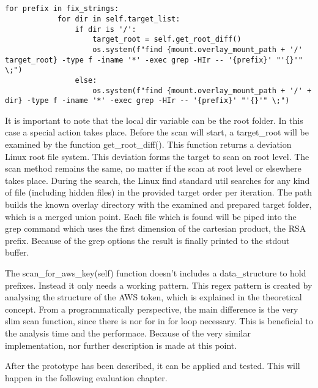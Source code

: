 \lstset{language=Python}          %
\begin{lstlisting}[]  % Start your code-block
	

for prefix in fix_strings:
            for dir in self.target_list:
                if dir is '/':
                    target_root = self.get_root_diff()
                    os.system(f"find {mount.overlay_mount_path + '/' target_root} -type f -iname '*' -exec grep -HIr -- '{prefix}' "'{}'" \;")
                else:
                    os.system(f"find {mount.overlay_mount_path + '/' + dir} -type f -iname '*' -exec grep -HIr -- '{prefix}' "'{}'" \;")
\end{lstlisting}
It is important to note that the local dir variable can be the root folder. In this case a special action takes place. Before the scan will start, a target\_root will be examined by the function get\_root\_diff().
This function returns a deviation Linux root file system. This deviation forms the target to scan on root level. The scan method remains the same, no matter if the scan at root level or elsewhere takes place.
During the search, the Linux find standard util searches for any kind of file (including hidden files) in the provided target order per iteration. The path builds the known overlay directory with the examined and prepared target folder, which is a merged union point.
Each file which is found will be piped into the grep command which uses the first dimension of the cartesian product, the RSA prefix. Because of the grep options the result is finally printed to the stdout buffer.

The scan\_for\_aws\_key(self) function doesn't includes a data\_structure to hold prefixes. Instead it only needs a working pattern. This regex pattern is created by analysing the structure of the AWS token, which is explained in the theoretical concept. From a programmatically perspective, the main difference is the very slim scan function, since there is nor for in for loop necessary. This is beneficial to the analysis time and the performace.
Because of the very similar implementation, nor further description is made at this point.

After the prototype has been described, it can be applied and tested. This will happen in the following evaluation chapter.
	

